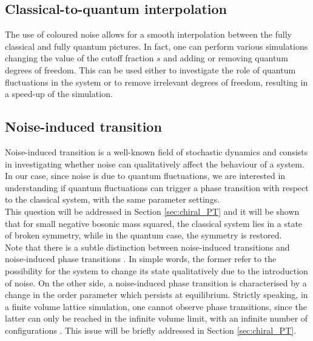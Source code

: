 \subsection{Classical-to-quantum interpolation}
The use of coloured noise allows for a smooth interpolation between the fully classical and fully quantum pictures. In fact, one can perform various simulations changing the value of the cutoff fraction $s$ and adding or removing quantum degrees of freedom. This can be used either to investigate the role 
of quantum fluctuations in the system or to remove irrelevant degrees of freedom, resulting in a speed-up of the simulation.

\subsection{Noise-induced transition}
Noise-induced transition is a well-known field of stochastic dynamics \cite{gardiner,noiseinduced} and consists in investigating
whether noise can qualitatively affect the behaviour of a system. In our case, since noise is due to quantum fluctuations, we are interested in understanding if quantum fluctuations can trigger a phase transition with respect to the classical system, with the same parameter settings. \\
This question will be addressed in Section \ref{sec:chiral_PT} and it will be shown that for small negative bosonic mass squared, the classical system lies in a state of broken symmetry, while in the quantum case, the symmetry is restored. \\
Note that there is a subtle distinction between noise-induced transitions and noise-induced phase transitions \cite{noiseinduced_2}. In simple words, the former refer to the possibility for the system to change its state qualitatively due to the introduction of noise. On the other side, a noise-induced phase transition is characterised by a change in the order parameter which persists at equilibrium. 
Strictly speaking, in a finite volume lattice simulation, one cannot observe phase transitions, since the latter 
can only be reached in the infinite volume limit, with an infinite number of configurations \cite{friedli_velenik_2017}. This issue will be briefly addressed in Section \ref{sec:chiral_PT}.

